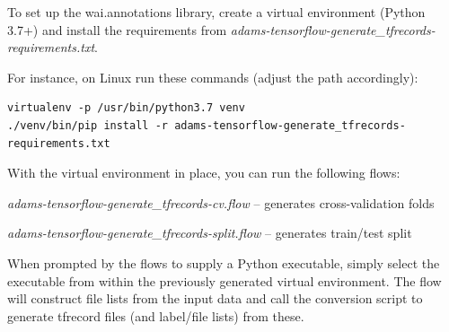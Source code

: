 \documentclass[a4paper]{book}
\begin{document}
To set up the wai.annotations library, create a virtual environment (Python 3.7+)
and install the requirements from \textit{adams-tensorflow-generate\_tfrecords-requirements.txt}.

\noindent For instance, on Linux run these commands (adjust the path accordingly):
{\scriptsize
\begin{verbatim}
virtualenv -p /usr/bin/python3.7 venv
./venv/bin/pip install -r adams-tensorflow-generate_tfrecords-requirements.txt
\end{verbatim}}

\noindent With the virtual environment in place, you can run the following flows:
\begin{tight_itemize}
  \item \textit{adams-tensorflow-generate\_tfrecords-cv.flow} -- generates cross-validation folds
  \item \textit{adams-tensorflow-generate\_tfrecords-split.flow} -- generates train/test split
\end{tight_itemize}
When prompted by the flows to supply a Python executable, simply select the
executable from within the previously generated virtual environment. The flow
will construct file lists from the input data and call the conversion script
to generate tfrecord files (and label/file lists) from these.



\end{document}
